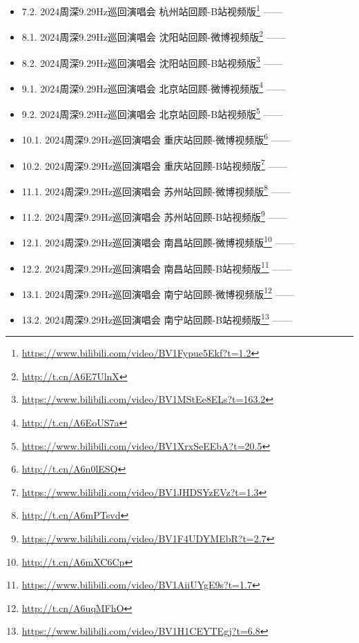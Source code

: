 \documentclass[]{ctexbook}
\renewcommand{\href}[2]{#2\footnote{\url{#1}}}
\begin{document}
\begin{itemize}
\item
  7.2. \href{https://www.bilibili.com/video/BV1Fypue5Ekf?t=1.2}{2024周深9.29Hz巡回演唱会 杭州站回顾-B站视频版} ------ \citet{bili-charlie-studio}
\item
  8.1. \href{http://t.cn/A6E7UlnX}{2024周深9.29Hz巡回演唱会 沈阳站回顾-微博视频版} ------ \citet{weibo-charlie-studio}\\
\item
  8.2. \href{https://www.bilibili.com/video/BV1MStEe8ELs?t=163.2}{2024周深9.29Hz巡回演唱会 沈阳站回顾-B站视频版} ------ \citet{bili-charlie-studio}
\item
  9.1. \href{http://t.cn/A6EoUS7a}{2024周深9.29Hz巡回演唱会 北京站回顾-微博视频版} ------ \citet{weibo-charlie-studio}\\
\item
  9.2. \href{https://www.bilibili.com/video/BV1XrxSeEEbA?t=20.5}{2024周深9.29Hz巡回演唱会 北京站回顾-B站视频版} ------ \citet{bili-charlie-studio}
\item
  10.1. \href{http://t.cn/A6n0lESQ}{2024周深9.29Hz巡回演唱会 重庆站回顾-微博视频版} ------ \citet{weibo-charlie-studio}\\
\item
  10.2. \href{https://www.bilibili.com/video/BV1JHDSYzEVz?t=1.3}{2024周深9.29Hz巡回演唱会 重庆站回顾-B站视频版} ------ \citet{bili-charlie-studio}
\item
  11.1. \href{http://t.cn/A6mPTsvd}{2024周深9.29Hz巡回演唱会 苏州站回顾-微博视频版} ------ \citet{weibo-charlie-studio}\\
\item
  11.2. \href{https://www.bilibili.com/video/BV1F4UDYMEbR?t=2.7}{2024周深9.29Hz巡回演唱会 苏州站回顾-B站视频版} ------ \citet{bili-charlie-studio}
\item
  12.1. \href{http://t.cn/A6mXC6Cp}{2024周深9.29Hz巡回演唱会 南昌站回顾-微博视频版} ------ \citet{weibo-charlie-studio}\\
\item
  12.2. \href{https://www.bilibili.com/video/BV1AiiUYgE9s?t=1.7}{2024周深9.29Hz巡回演唱会 南昌站回顾-B站视频版} ------ \citet{bili-charlie-studio}
\item
  13.1. \href{http://t.cn/A6uqMFhO}{2024周深9.29Hz巡回演唱会 南宁站回顾-微博视频版} ------ \citet{weibo-charlie-studio}\\
\item
  13.2. \href{https://www.bilibili.com/video/BV1H1CEYTEgj?t=6.8}{2024周深9.29Hz巡回演唱会 南宁站回顾-B站视频版} ------ \citet{bili-charlie-studio}\\

\end{itemize}
\end{document}
